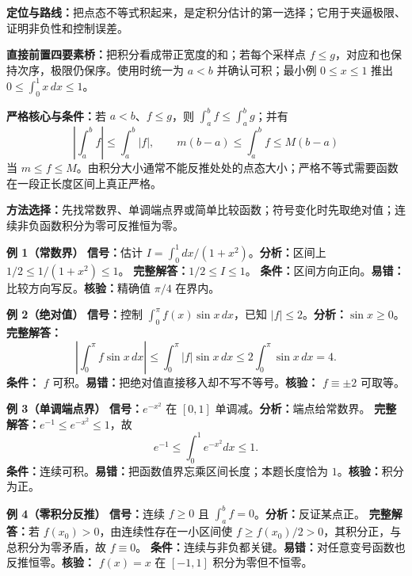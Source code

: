 
\par

\begin{knowledgeBox}
\textbf{定位与路线：}把点态不等式积起来，是定积分估计的第一选择；它用于夹逼极限、证明非负性和控制误差。

\textbf{直接前置四要素桥：}把积分看成带正宽度的和；若每个采样点 \(f\le g\)，对应和也保持次序，极限仍保序。使用时统一为 \(a<b\) 并确认可积；最小例 \(0\le x\le1\) 推出 \(0\le\int_0^1x\,dx\le1\)。

\textbf{严格核心与条件：}若 \(a<b\)、\(f\le g\)，则 \(\int_a^bf\le\int_a^bg\)；并有
\[
\left|\int_a^bf\right|\le\int_a^b|f|,\qquad
m(b-a)\le\int_a^bf\le M(b-a)
\]
当 \(m\le f\le M\)。由积分大小通常不能反推处处的点态大小；严格不等式需要函数在一段正长度区间上真正严格。

\textbf{方法选择：}先找常数界、单调端点界或简单比较函数；符号变化时先取绝对值；连续非负函数积分为零可反推恒为零。

\textbf{例 1（常数界）}\quad
\textbf{信号：}估计 \(I=\int_0^1dx/(1+x^2)\)。\textbf{分析：}区间上 \(1/2\le1/(1+x^2)\le1\)。
\textbf{完整解答：}\(1/2\le I\le1\)。
\textbf{条件：}区间方向正向。\textbf{易错：}比较方向写反。\textbf{核验：}精确值 \(\pi/4\) 在界内。

\textbf{例 2（绝对值）}\quad
\textbf{信号：}控制 \(\int_0^\pi f(x)\sin x\,dx\)，已知 \(|f|\le2\)。\textbf{分析：}\(\sin x\ge0\)。
\textbf{完整解答：}
\[
\left|\int_0^\pi f\sin x\,dx\right|
\le\int_0^\pi|f|\sin x\,dx\le2\int_0^\pi\sin x\,dx=4.
\]
\textbf{条件：} \(f\) 可积。\textbf{易错：}把绝对值直接移入却不写不等号。\textbf{核验：} \(f\equiv\pm2\) 可取等。

\textbf{例 3（单调端点界）}\quad
\textbf{信号：}\(e^{-x^2}\) 在 \([0,1]\) 单调减。\textbf{分析：}端点给常数界。
\textbf{完整解答：}\(e^{-1}\le e^{-x^2}\le1\)，故
\[
e^{-1}\le\int_0^1e^{-x^2}dx\le1.
\]
\textbf{条件：}连续可积。\textbf{易错：}把函数值界忘乘区间长度；本题长度恰为 \(1\)。\textbf{核验：}积分为正。

\textbf{例 4（零积分反推）}\quad
\textbf{信号：}连续 \(f\ge0\) 且 \(\int_a^bf=0\)。\textbf{分析：}反证某点正。
\textbf{完整解答：}若 \(f(x_0)>0\)，由连续性存在一小区间使 \(f\ge f(x_0)/2>0\)，其积分正，与总积分为零矛盾，故 \(f\equiv0\)。
\textbf{条件：}连续与非负都关键。\textbf{易错：}对任意变号函数也反推恒零。\textbf{核验：} \(f(x)=x\) 在 \([-1,1]\) 积分为零但不恒零。


\end{knowledgeBox}

